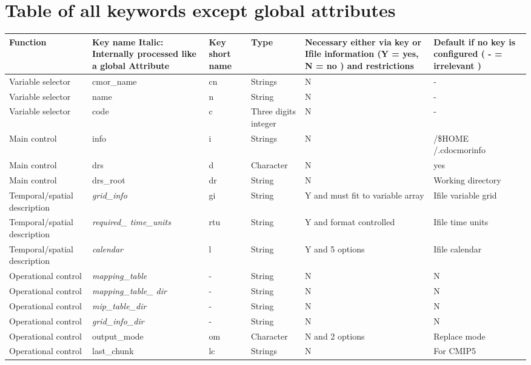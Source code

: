 \appendix

\chapter{Table of all keywords except global attributes}
\label{chap:AllKeys}
\begin{tabular}{|p{3cm}|p{2.5cm}|p{1cm}|p{2cm}|p{3cm}|p{2cm}|}
\hline 
\textbf{Function} & \textbf{Key name} Italic: Internally processed like a global Attribute & \textbf{Key short name} & \textbf{Type} & \textbf{Necessary either via key or Ifile information (Y = yes, N = no ) and restrictions} & \textbf{Default if no key is configured} ( - = irrelevant ) \\ 
\hline 
Variable selector & cmor\_name & cn & Strings & N & - \\ 
\hline 
Variable selector & name & n & String & N & - \\ 
\hline 
Variable selector & code & c & Three digits integer & N & - \\ 
\hline 
\hline 
Main control & info & i & Strings & N & /\$HOME
/.cdocmorinfo \\ 
\hline 
Main control & drs & d & Character & N & yes \\ 
\hline 
Main control & drs\_root & dr & String & N & Working directory \\ 
\hline 
\hline 
Temporal/spatial description & \textit{grid\_info} & gi & String & Y and must fit to variable array & Ifile variable grid \\ 
\hline 
Temporal/spatial description & \textit{required\_
time\_units} & rtu & String & Y and format controlled & Ifile time units \\ 
\hline 
Temporal/spatial description & \textit{calendar} & l & String & Y and 5 options & Ifile calendar \\ 
\hline 
\hline 
Operational control & \textit{mapping\_table} & - & String & N & N \\ 
\hline 
Operational control & \textit{mapping\_table\_
dir} & - & String & N & N \\ 
\hline 
Operational control & \textit{mip\_table\_dir} & - & String & N & N \\ 
\hline 
Operational control & \textit{grid\_info\_dir} & - & String & N & N \\ 
\hline 
Operational control & output\_mode & om & Character & N and 2 options & Replace mode \\
\hline 
Operational control & last\_chunk & lc & Strings & N & For CMIP5 \\

\end{tabular}

